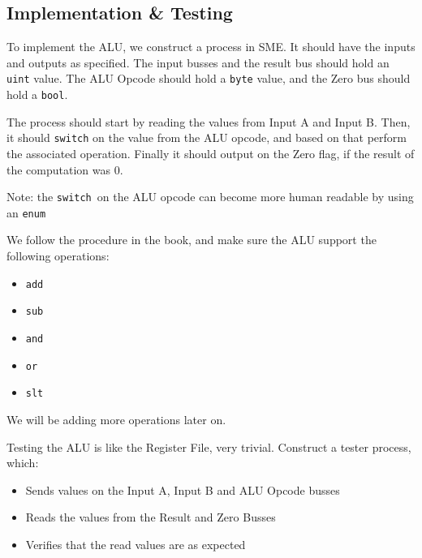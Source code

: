 \documentclass{beamer}
\begin{document}
\subsection{Implementation \& Testing}
\begin{frame}
    To implement the ALU, we construct a process in
    SME. It should have the inputs and outputs as specified. The input busses
    and the result bus should hold an \texttt{uint} value. The ALU Opcode
    should hold a \texttt{byte} value, and the Zero bus should hold a
    \texttt{bool}.
\end{frame}
\begin{frame}
    The process should start by reading the values from Input A and Input B.
    Then, it should \texttt{switch} on the value from the ALU opcode, and based
    on that perform the associated operation. Finally it should output on the
    Zero flag, if the result of the computation was 0.

    \vspace{\baselineskip}
    Note: the \texttt{switch} on the ALU opcode can become more human readable
    by using an \texttt{enum}
\end{frame}
\begin{frame}
    We follow the procedure in the book, and make sure the ALU support the
    following operations:
    \begin{itemize}
        \item \texttt{add}
        \item \texttt{sub}
        \item \texttt{and}
        \item \texttt{or}
        \item \texttt{slt}
    \end{itemize}
    We will be adding more operations later on.
\end{frame}
\begin{frame}
    Testing the ALU is like the Register File, very trivial. Construct a tester
    process, which:
    \begin{itemize}
        \item Sends values on the Input A, Input B and ALU Opcode busses
        \item Reads the values from the Result and Zero Busses
        \item Verifies that the read values are as expected
    \end{itemize}
\end{frame}
\end{document}
